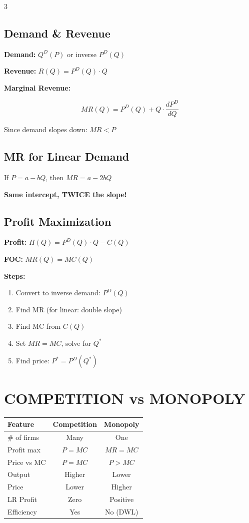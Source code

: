\documentclass[8pt,landscape,letterpaper]{extarticle}
\begin{document}
\begin{multicols}{3}
\subsection*{Demand \& Revenue}
\textbf{Demand:} $Q^D(P)$ or inverse $P^D(Q)$

\textbf{Revenue:} $R(Q) = P^D(Q) \cdot Q$

\textbf{Marginal Revenue:}
\begin{keybox}
\[
MR(Q) = P^D(Q) + Q \cdot \frac{dP^D}{dQ}
\]

Since demand slopes down: $\boxed{MR < P}$
\end{keybox}

\subsection*{MR for Linear Demand}
\begin{keybox}
If $P = a - bQ$, then $\boxed{MR = a - 2bQ}$

\textbf{Same intercept, TWICE the slope!}
\end{keybox}

\subsection*{Profit Maximization}
\begin{keybox}
\textbf{Profit:} $\Pi(Q) = P^D(Q) \cdot Q - C(Q)$

\textbf{FOC:} $\boxed{MR(Q) = MC(Q)}$
\end{keybox}

\textbf{Steps:}
\begin{enumerate}[leftmargin=10pt]
\item Convert to inverse demand: $P^D(Q)$
\item Find MR (for linear: double slope)
\item Find MC from $C(Q)$
\item Set $MR = MC$, solve for $Q^*$
\item Find price: $P^* = P^D(Q^*)$
\end{enumerate}

\columnbreak

\section*{COMPETITION vs MONOPOLY}

\begin{tabular}{lcc}
\toprule
\textbf{Feature} & \textbf{Competition} & \textbf{Monopoly} \\
\midrule
\# of firms & Many & One \\
Profit max & $P = MC$ & $MR = MC$ \\
Price vs MC & $P = MC$ & $P > MC$ \\
Output & Higher & Lower \\
Price & Lower & Higher \\
LR Profit & Zero & Positive \\
Efficiency & Yes & No (DWL) \\
\bottomrule
\end{tabular}


\end{multicols}
\end{document}
